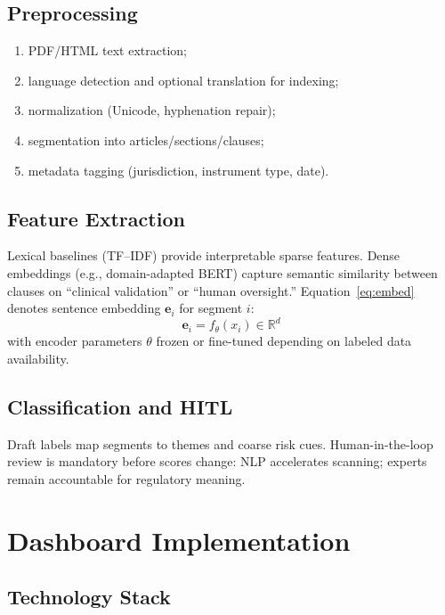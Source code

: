 \subsection{Preprocessing}

\begin{enumerate}[noitemsep]
  \item PDF/HTML text extraction;
  \item language detection and optional translation for indexing;
  \item normalization (Unicode, hyphenation repair);
  \item segmentation into articles/sections/clauses;
  \item metadata tagging (jurisdiction, instrument type, date).
\end{enumerate}

\subsection{Feature Extraction}

Lexical baselines (TF--IDF) provide interpretable sparse features. Dense embeddings (e.g., domain-adapted BERT) capture semantic similarity between clauses on ``clinical validation'' or ``human oversight.'' Equation~\eqref{eq:embed} denotes sentence embedding $\mathbf{e}_i$ for segment $i$:
\begin{equation}
\label{eq:embed}
\mathbf{e}_i = f_\theta(x_i) \in \mathbb{R}^d
\end{equation}
with encoder parameters $\theta$ frozen or fine-tuned depending on labeled data availability.

\subsection{Classification and HITL}

Draft labels map segments to themes and coarse risk cues. Human-in-the-loop review is mandatory before scores change: NLP accelerates scanning; experts remain accountable for regulatory meaning.

\section{Dashboard Implementation}
\label{sec:dashimpl}

\subsection{Technology Stack}

